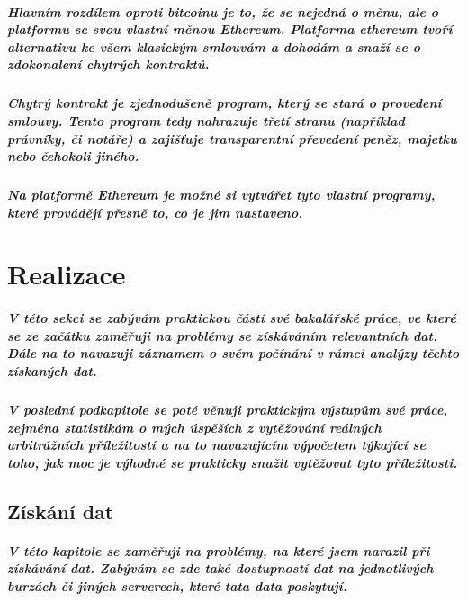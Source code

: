 \documentclass[thesis=B,czech]{FITthesis}[2019/03/21]
\begin{document}
\paragraph{
Hlavním rozdílem oproti bitcoinu je to, že se nejedná o měnu, ale o platformu se svou vlastní měnou Ethereum. Platforma ethereum tvoří alternativu ke všem klasickým smlouvám a dohodám a snaží se o zdokonalení chytrých kontraktů. \cite{btc_vs_eth}
}
\paragraph{
Chytrý kontrakt je zjednodušeně program, který se stará o provedení smlouvy. Tento program tedy nahrazuje třetí stranu (například právníky, či notáře) a zajišťuje transparentní převedení peněz, majetku nebo čehokoli jiného. 
}
\paragraph{
Na platformě Ethereum je možné si vytvářet tyto vlastní programy, které provádějí přesně to, co je jim nastaveno. \cite{ethereum}
}

\chapter{Realizace}
\paragraph{
V této sekci se zabývám praktickou částí své bakalářské práce, ve které se ze začátku zaměřuji na problémy se získáváním relevantních dat. Dále na to navazuji záznamem o svém počínání v rámci analýzy těchto získaných dat. 
}
\paragraph{
V poslední podkapitole se poté věnuji praktickým výstupům své práce, zejména statistikám o mých úspěších z vytěžování reálných arbitrážních příležitostí a na to navazujícím výpočetem týkající se toho, jak moc je výhodné se prakticky snažit vytěžovat tyto příležitosti.
}
\section{Získání dat}
\paragraph{
V této kapitole se zaměřuji na problémy, na které jsem narazil při získávání dat. Zabývám se zde také dostupností dat na jednotlivých burzách či jiných serverech, které tata data poskytují. 
}
\end{document}
